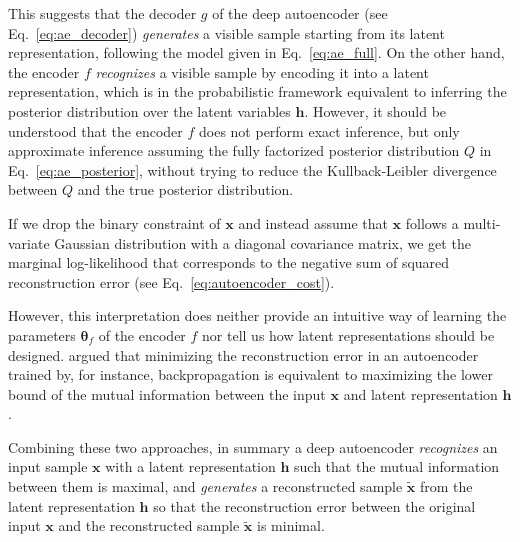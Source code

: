 \documentclass[dissertation,nocontribution,draft*]{aaltoseries}
\newcommand{\vect}[1]{\mathbf{#1}}
\newcommand{\vects}[1]{\boldsymbol{#1}}
\newcommand{\vh}[0]{\vect{h}}
\newcommand{\vx}[0]{\vect{x}}
\newcommand{\TT}[0]{{\vects{\theta}}}
\begin{document}
This suggests that the decoder $g$ of the deep autoencoder
(see Eq.~\eqref{eq:ae_decoder}) \textit{generates} a visible
sample starting from its latent representation, following
the model given in Eq.~\eqref{eq:ae_full}. On the other
hand, the encoder $f$ \textit{recognizes} a visible sample
by encoding it into a latent representation, which is in the
probabilistic framework equivalent to inferring the
posterior distribution over the latent variables $\vh$.
However, it should be understood that the encoder $f$ does
not perform exact inference, but only approximate inference
assuming the fully factorized posterior distribution $Q$ in
Eq.~\eqref{eq:ae_posterior}, without trying to reduce
the Kullback-Leibler divergence between $Q$ and the true
posterior distribution.

If we drop the binary constraint of $\vx$ and instead assume
that $\vx$ follows a multi-variate Gaussian distribution
with a diagonal covariance matrix, we get the marginal
log-likelihood that corresponds to the negative sum of
squared reconstruction error (see
Eq.~\eqref{eq:autoencoder_cost}).

However, this interpretation does neither provide an
intuitive way of learning the parameters $\TT_f$ of the
encoder $f$ nor tell us how latent representations should be
designed.  \citet{Vincent2010} argued that minimizing the
reconstruction error in an autoencoder trained by, for
instance, backpropagation is equivalent to maximizing the
lower bound of the mutual information between the input
$\vx$ and latent representation $\vh$. 

Combining these two approaches, in summary a deep
autoencoder \textit{recognizes} an input sample $\vx$ with a
latent representation $\vh$ such that the mutual information
between them is maximal, and \textit{generates} a
reconstructed sample $\tilde{\vx}$ from the latent
representation $\vh$ so that the reconstruction error
between the original input $\vx$ and the reconstructed
sample $\tilde{\vx}$ is minimal.

\end{document}
